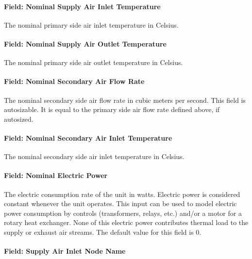 \paragraph{Field: Nominal Supply Air Inlet Temperature}\label{field-nominal-supply-air-inlet-temperature}

The nominal primary side air inlet temperature in Celsius.

\paragraph{Field: Nominal Supply Air Outlet Temperature}\label{field-nominal-supply-air-outlet-temperature}

The nominal primary side air outlet temperature in Celsius.

\paragraph{Field: Nominal Secondary Air Flow Rate}\label{field-nominal-secondary-air-flow-rate}

The nominal secondary side air flow rate in cubic meters per second. This field is autosizable. It is equal to the primary side air flow rate defined above, if autosized.

\paragraph{Field: Nominal Secondary Air Inlet Temperature}\label{field-nominal-secondary-air-inlet-temperature}

The nominal secondary side air inlet temperature in Celsius.

\paragraph{Field: Nominal Electric Power}\label{field-nominal-electric-power}

The electric consumption rate of the unit in watts. Electric power is considered constant whenever the unit operates. This input can be used to model electric power consumption by controls (transformers, relays, etc.) and/or a motor for a rotary heat exchanger. None of this electric power contributes thermal load to the supply or exhaust air streams. The default value for this field is 0.

\paragraph{Field: Supply Air Inlet Node Name}\label{field-supply-air-inlet-node-name-000}

